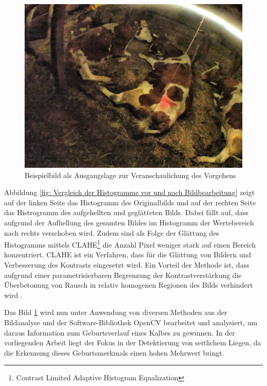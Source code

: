 \begin{figure}[H]
	\center
	\includegraphics[scale=0.43]{Grafiken/entwicklung/1ausgangsbildBericht.jpg}
	\caption{Beispielbild als Ausgangslage zur Veranschaulichung des Vorgehens} 
	\label{fig: Ausgangslage für die Bildanalyse}
\end{figure}

Abbildung \ref{fig: Vergleich der Histogramme vor und nach Bildbearbeitung} zeigt auf der linken Seite das Histogramm des Originalbilds und auf der rechten Seite das Histrogramm des aufgehellten und geglätteten Bilds. Dabei fällt auf, dass aufgrund der Aufhellung des gesamten Bildes im Histogramm der Wertebereich nach rechts verschoben wird. Zudem sind als Folge der Glättung des Histogramms mittels CLAHE\footnote{Contrast Limited Adaptive Histogram Equalization} die Anzahl Pixel weniger stark auf einen Bereich konzentriert. CLAHE ist ein Verfahren, dass für die Glättung von Bildern und Verbesserung des Kontrasts eingesetzt wird. Ein Vorteil der Methode ist, dass aufgrund einer parametrisierbaren Begrenzung der Kontrastverstärkung die Überbetonung von Rausch in relativ homogenen Regionen des Bilds verhindert wird \citep[S. 313]{FernandezVillan2019}.

Das Bild \ref{fig: Ausgangslage für die Bildanalyse} wird nun unter Anwendung von diversen Methoden aus der Bildanalyse und der Software-Bibliothek OpenCV bearbeitet und analysiert, um daraus Information zum Geburtsverlauf eines Kalbes zu gewinnen. In der vorliegenden Arbeit liegt der Fokus in der Detektierung von seitlichem Liegen, da die Erkennung dieses Geburtsmerkmals einen hohen Mehrwert bringt. 

